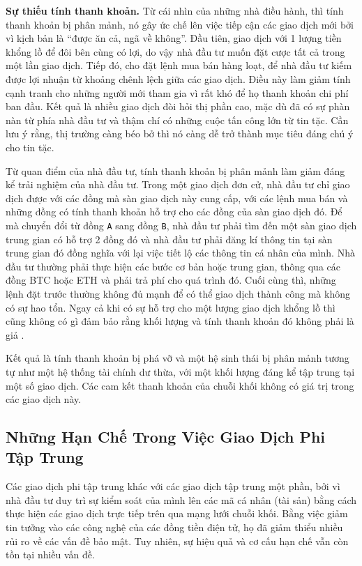 \documentclass{article}
\begin{document}
\begin{multicols}{2}
\textbf{Sự thiếu tính thanh khoản.} Từ cái nhìn của những nhà điều hành, thì tính thanh khoản bị phân mảnh, nó gây ức chế lên việc tiếp cận các giao dịch mới bởi vì kịch bản là “được ăn cả, ngã về không”. Đầu tiên, giao dịch với 1 lượng tiền khổng lồ để đôi bên cùng có lợi, do vậy nhà đầu tư muốn đặt cược tất cả trong một lần giao dịch. Tiếp đó, cho đặt lệnh mua bán hàng loạt, để nhà đầu tư kiếm được lợi nhuận từ khoảng chênh lệch giữa các giao dịch. Điều này làm giảm tính cạnh tranh cho những người mới tham gia vì rất khó để họ thanh khoản chi phí ban đầu. Kết quả là nhiều giao dịch đòi hỏi thị phần cao, mặc dù đã có sự phàn nàn từ phía nhà đầu tư và thậm chí có những cuộc tấn công lớn từ tin tặc. Cần lưu ý rằng, thị trường càng béo bở thì nó càng dễ trở thành mục tiêu đáng chú ý cho tin tặc.

Từ quan điểm của nhà đầu tư, tính thanh khoản bị phân mảnh làm giảm đáng kể trải nghiệm của nhà đầu tư. Trong một giao dịch đơn cử, nhà đầu tư chỉ giao dịch được với các đồng mà sàn giao dịch này cung cấp, với các lệnh mua bán và những đồng có tính thanh khoản hỗ trợ cho các đồng của sàn giao dịch đó. Để mà chuyển đổi từ đồng \verb|A| sang đồng \verb|B|, nhà đầu tư phải tìm đến một sàn giao dịch trung gian có hỗ trợ 2 đồng đó và nhà đầu tư phải đăng kí thông tin tại sàn trung gian đó đồng nghĩa với lại việc tiết lộ các thông tin cá nhân của mình. Nhà đầu tư thường phải thực hiện các bước cơ bản hoặc trung gian, thông qua các đồng BTC hoặc ETH và phải trả phí cho quá trình đó. Cuối cùng thì, những lệnh đặt trước thường không đủ mạnh để có thể giao dịch thành công mà không có sự hao tổn. Ngay cả khi có sự hỗ trợ cho một lượng giao dịch khổng lồ thì cũng không có gì đảm bảo rằng khối lượng và tính thanh khoản đó không phải là giả \cite{fakevolume}. 

Kết quả là tính thanh khoản bị phá vỡ và một hệ sinh thái bị phân mảnh tương tự như một hệ thống tài chính dư thừa, với một khối lượng đáng kể tập trung tại một số giao dịch. Các cam kết thanh khoản của chuỗi khối không có giá trị trong các giao dịch này.

\subsection{Những Hạn Chế Trong Việc Giao Dịch Phi Tập Trung}
Các giao dịch phi tập trung khác với các giao dịch tập trung một phần, bởi vì nhà đầu tư duy trì sự kiểm soát của mình lên các mã cá nhân (tài sản) bằng cách thực hiện các giao dịch trực tiếp trên qua mạng lưới chuỗi khối. Bằng việc giảm tin tưởng vào các công nghệ của các đồng tiền điện tử, họ đã giảm thiểu nhiều rủi ro về các vấn đề bảo mật. Tuy nhiên, sự hiệu quả và cơ cấu hạn chế vẫn còn tồn tại nhiều vấn đề. 


\end{multicols}
\end{document}
